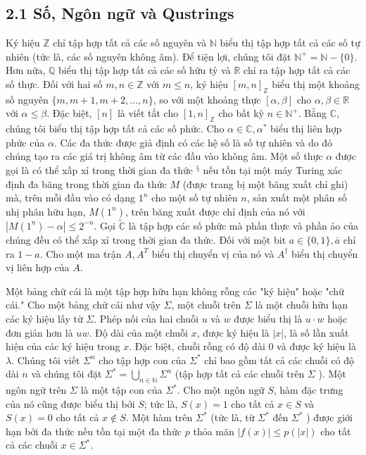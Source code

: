 \documentclass[10pt]{article}
\begin{document}
\subsection*{2.1 Số, Ngôn ngữ và Qustrings}
Ký hiệu $\mathbb{Z}$ chỉ tập hợp tất cả các số nguyên và $\mathbb{N}$ biểu thị tập hợp tất cả các số tự nhiên (tức là, các số nguyên không âm). Để tiện lợi, chúng tôi đặt $\mathbb{N}^{+}=\mathbb{N}-\{0\}$. Hơn nữa, $\mathbb{Q}$ biểu thị tập hợp tất cả các số hữu tỷ và $\mathbb{R}$ chỉ ra tập hợp tất cả các số thực. Đối với hai số $m, n \in \mathbb{Z}$ với $m \leq n$, ký hiệu $[m, n]_{\mathbb{Z}}$ biểu thị một khoảng số nguyên $\{m, m+1, m+2, \ldots, n\}$, so với một khoảng thực $[\alpha, \beta]$ cho $\alpha, \beta \in \mathbb{R}$ với $\alpha \leq \beta$. Đặc biệt, $[n]$ là viết tắt cho $[1, n]_{\mathbb{Z}}$ cho bất kỳ $n \in \mathbb{N}^{+}$. Bằng $\mathbb{C}$, chúng tôi biểu thị tập hợp tất cả các số phức. Cho $\alpha \in \mathbb{C}, \alpha^{*}$ biểu thị liên hợp phức của $\alpha$. Các đa thức được giả định có các hệ số là số tự nhiên và do đó chúng tạo ra các giá trị không âm từ các đầu vào không âm. Một số thực $\alpha$ được gọi là có thể xấp xỉ trong thời gian đa thức ${ }^{§}$ nếu tồn tại một máy Turing xác định đa băng trong thời gian đa thức $M$ (được trang bị một băng xuất chỉ ghi) mà, trên mỗi đầu vào có dạng $1^{n}$ cho một số tự nhiên $n$, sản xuất một phân số nhị phân hữu hạn, $M\left(1^{n}\right)$, trên băng xuất được chỉ định của nó với $\left|M\left(1^{n}\right)-\alpha\right| \leq 2^{-n}$. Gọi $\tilde{\mathbb{C}}$ là tập hợp các số phức mà phần thực và phần ảo của chúng đều có thể xấp xỉ trong thời gian đa thức. Đối với một bit $a \in\{0,1\}, \bar{a}$ chỉ ra $1-a$. Cho một ma trận $A, A^{T}$ biểu thị chuyển vị của nó và $A^{\dagger}$ biểu thị chuyển vị liên hợp của $A$.

Một bảng chữ cái là một tập hợp hữu hạn không rỗng các "ký hiệu" hoặc "chữ cái." Cho một bảng chữ cái như vậy $\Sigma$, một chuỗi trên $\Sigma$ là một chuỗi hữu hạn các ký hiệu lấy từ $\Sigma$. Phép nối của hai chuỗi $u$ và $w$ được biểu thị là $u \cdot w$ hoặc đơn giản hơn là $u w$. Độ dài của một chuỗi $x$, được ký hiệu là $|x|$, là số lần xuất hiện của các ký hiệu trong $x$. Đặc biệt, chuỗi rỗng có độ dài 0 và được ký hiệu là $\lambda$. Chúng tôi viết $\Sigma^{n}$ cho tập hợp con của $\Sigma^{*}$ chỉ bao gồm tất cả các chuỗi có độ dài $n$ và chúng tôi đặt $\Sigma^{*}=\bigcup_{n \in \mathbb{N}} \Sigma^{n}$ (tập hợp tất cả các chuỗi trên $\Sigma$ ). Một ngôn ngữ trên $\Sigma$ là một tập con của $\Sigma^{*}$. Cho một ngôn ngữ $S$, hàm đặc trưng của nó cũng được biểu thị bởi $S$; tức là, $S(x)=1$ cho tất cả $x \in S$ và $S(x)=0$ cho tất cả $x \notin S$. Một hàm trên $\Sigma^{*}$ (tức là, từ $\Sigma^{*}$ đến $\Sigma^{*}$ ) được giới hạn bởi đa thức nếu tồn tại một đa thức $p$ thỏa mãn $|f(x)| \leq p(|x|)$ cho tất cả các chuỗi $x \in \Sigma^{*}$.
\end{document}

